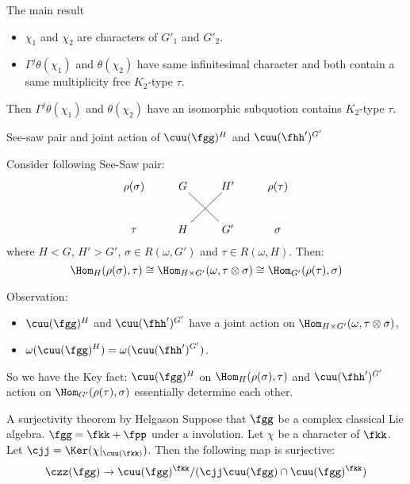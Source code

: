 \documentclass[final,hyperref={pdfpagelabels=false}]{beamer} %
\def\cC{\mathcal{C}}
\begin{document}
\begin{frame}
\begin{minipage}[t]{.48\linewidth}
\begin{block}{The main result}
\begin{itemize}
\begin{itemize}
        \item we can view $(\fgg, K_1)$-module as $(\fgg, K_1\cap K_2)$-module
        \item $\left(\Gamma_{\fgg,K_1\cap K_2}^{\fgg,K_2}\right)^j$ gives a functor 
          from $\cC(\fgg, K_1)$ to $\cC(\fgg,K_2)$.
        \end{itemize}
      \item $\chi_1$ and $\chi_2$ are characters of $G'_1$ and $G'_2$.
      \item $\Gamma^j\theta(\chi_1)$ and  $\theta(\chi_2)$ 
        have same infinitesimal character
        and both contain a same multiplicity free $K_2$-type $\tau$.
      \end{itemize}
      Then 
      $\Gamma^j\theta(\chi_1)$ and $\theta(\chi_2)$ 
      have an isomorphic subquotion contains  $K_2$-type $\tau$.
    \end{block}
    
    \begin{block}{See-saw pair and  joint action of $\cuu(\fgg)^H$ 
and $\cuu(\fhh')^{G'}$}

Consider following See-Saw pair:
\[
\xymatrix{
\rho(\sigma)& G \ar@{-}[dr] & H'& \rho(\tau)\\
\tau &H\ar@{-}[ur] & G' & \sigma
}
\]
where $H < G$, $H'> G'$, $\sigma\in R(\omega, G')$ and  $\tau\in R(\omega,H)$.
Then:
\[
\Hom_{H}(\rho(\sigma), \tau) 
\cong  \Hom_{H\times G'}(\omega, \tau\otimes \sigma)
\cong  \Hom_{G'}(\rho(\tau), \sigma)
\]

Observation:
\begin{itemize}
\item $\cuu(\fgg)^H$ and $\cuu(\fhh')^{G'}$ 
  have a joint action on $\Hom_{H\times G'}(\omega,\tau\otimes\sigma)$,
\item $\displaystyle \omega(\cuu(\fgg)^H) = \omega(\cuu(\fhh')^{G'})$.
\end{itemize}

So we have the Key fact: $\cuu(\fgg)^H$ on $\Hom_H(\rho(\sigma),\tau)$ and $\cuu(\fhh')^{G'}$  action on $\Hom_{G'}(\rho(\tau),\sigma)$ essentially determine each other.
\end{block}

\begin{block}{A surjectivity theorem by Helgason}
  Suppose that $\fgg$ be a complex classical Lie algebra.  
  $\fgg = \fkk+\fpp$ under a involution. 
  Let $\chi$ be a character of $\fkk$.
  Let $\cjj = \Ker(\chi|_{\cuu(\fkk)})$.
  Then the following map is surjective:
  \[
  \czz(\fgg) \to \cuu(\fgg)^\fkk/(\cjj\cuu(\fgg)\cap\cuu(\fgg)^\fkk)
  \]
\end{block}


\end{minipage}
\end{frame}
\end{document}
